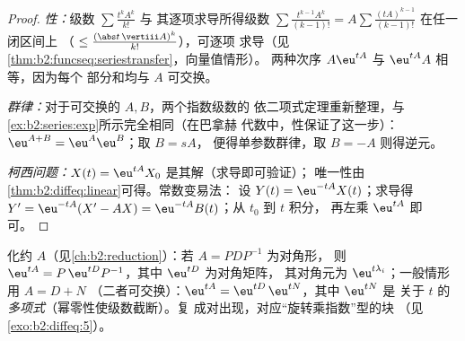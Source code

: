 \begin{proof}
\emph{性：}级数 $\sum \frac{t^kA^k}{k!}$ 与
其逐项求导所得级数 $\sum \frac{t^{k-1}A^k}{(k-1)!} = A\sum
\frac{(tA)^{k-1}}{(k-1)!}$ 在任一闭区间上
（ $\leq \frac{(\abs t\,\vertiii A)^k}{k!}$），可逐项
求导（见\cref{thm:b2:funcseq:seriestransfer}，向量值情形）。
两种次序 $A\eu^{tA}$ 与 $\eu^{tA}A$ 相等，因为每个
部分和均与 $A$ 可交换。

\emph{群律：}对于可交换的 $A, B$，两个指数级数的
依二项式定理重新整理，与
\cref{ex:b2:series:exp}所示完全相同（在巴拿赫
代数中，性保证了这一步）：$\eu^{A+B} = \eu^A\eu^B$；取 $B = sA$，
便得单参数群律，取 $B = -A$ 则得逆元。

\emph{柯西问题：}$X(t) = \eu^{tA}X_0$ 是其解（求导即可验证）；
唯一性由\cref{thm:b2:diffeq:linear}可得。常数变易法：
设 $Y(t) = \eu^{-tA}X(t)$；求导得 $Y' = \eu^{-tA}(X' -
AX) = \eu^{-tA}B(t)$；从 $t_0$ 到 $t$ 积分，
再左乘 $\eu^{tA}$ 即可。
\end{proof}

\begin{method}[计算 $\eu^{tA}$]\label{met:b2:diffeq:computeexp}
化约 $A$（见\cref{ch:b2:reduction}）：若 $A = PDP^{-1}$ 为对角形，
则 $\eu^{tA} = P\,\eu^{tD}P^{-1}$，其中 $\eu^{tD}$ 为对角矩阵，
其对角元为 $\eu^{t\lambda_i}$；一般情形用 $A = D + N$
（二者可交换）：$\eu^{tA} = \eu^{tD}\,\eu^{tN}$，其中 $\eu^{tN}$ 是
关于 $t$ 的\emph{多项式}（幂零性使级数截断）。复
成对出现，对应“旋转乘指数”型的块
（见\cref{exo:b2:diffeq:5}）。
\end{method}


